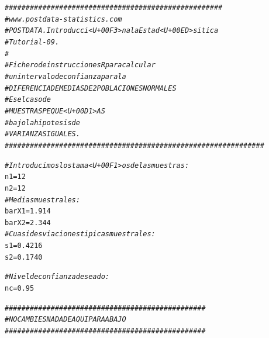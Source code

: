 \documentclass[10pt,a4paper]{article}\usepackage[]{graphicx}\usepackage[]{color}
\makeatletter
\newcommand{\hlnum}[1]{\textcolor[rgb]{0.686,0.059,0.569}{#1}}%
\newcommand{\hlcom}[1]{\textcolor[rgb]{0.678,0.584,0.686}{\textit{#1}}}%
\newcommand{\hlstd}[1]{\textcolor[rgb]{0.345,0.345,0.345}{#1}}%
\newcommand{\hlkwb}[1]{\textcolor[rgb]{0.69,0.353,0.396}{#1}}%
\newenvironment{kframe}{%
 \def\at@end@of@kframe{}%
 \ifinner\ifhmode%
  \def\at@end@of@kframe{\end{minipage}}%
  \begin{minipage}{\columnwidth}%
 \fi\fi%
 \def\FrameCommand##1{\hskip\@totalleftmargin \hskip-\fboxsep
 \colorbox{shadecolor}{##1}\hskip-\fboxsep
     \hskip-\linewidth \hskip-\@totalleftmargin \hskip\columnwidth}%
 \MakeFramed {\advance\hsize-\width
   \@totalleftmargin\z@ \linewidth\hsize
   \@setminipage}}%
 {\par\unskip\endMakeFramed%
 \at@end@of@kframe}
\newenvironment{knitrout}{}{} %
\makeatother
\begin{document}
\begin{knitrout}
\color{fgcolor}\begin{kframe}
\begin{alltt}
\hlcom{####################################################}
\hlcom{# www.postdata-statistics.com}
\hlcom{# POSTDATA. Introducci<U+00F3>n a la Estad<U+00ED>sitica}
\hlcom{# Tutorial-09.}
\hlcom{#}
\hlcom{# Fichero de instrucciones R para calcular}
\hlcom{# un intervalo de confianza para la}
\hlcom{# DIFERENCIA DE MEDIAS DE 2 POBLACIONES NORMALES}
\hlcom{# Es el caso de}
\hlcom{# MUESTRAS PEQUE<U+00D1>AS}
\hlcom{# bajo la hipotesis de}
\hlcom{# VARIANZAS IGUALES.}
\hlcom{##############################################################}

\hlcom{# Introducimos los tama<U+00F1>os de las muestras:}
\hlstd{n1} \hlkwb{=} \hlnum{12}
\hlstd{n2} \hlkwb{=} \hlnum{12}
\hlcom{# Medias muestrales:}
\hlstd{barX1} \hlkwb{=} \hlnum{1.914}
\hlstd{barX2} \hlkwb{=} \hlnum{2.344}
\hlcom{# Cuasidesviaciones tipicas muestrales:}
\hlstd{s1} \hlkwb{=} \hlnum{0.4216}
\hlstd{s2} \hlkwb{=} \hlnum{0.1740}

\hlcom{# Nivel de confianza deseado:}
\hlstd{nc} \hlkwb{=} \hlnum{0.95}

\hlcom{################################################}
\hlcom{#NO CAMBIES NADA DE AQUI PARA ABAJO}
\hlcom{################################################}


\end{alltt}
\end{kframe}
\end{knitrout}
\end{document}
